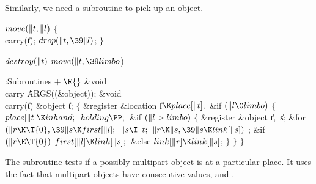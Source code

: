 Similarly, we need a subroutine to pick up an object.

\Y\B\4\D$\\{move}(\|t,\|l)$ \5
${}\{{}$\5
\1\\{carry}(\|t);\5
${}\\{drop}(\|t,\39\|l){}$;\5
${}\}{}$\2\par
\B\4\D$\\{destroy}(\|t)$ \5
$\\{move}(\|t,\39\\{limbo}{}$)\par
\Y\B\4:Subroutines\X${}\mathrel+\E{}$\6
\&{void} \\{carry}\,\,\.{ARGS}((\&{object}));\7
\&{void} \\{carry}(\|t)\1\1\6
\&{object} \|t;\2\2\6
${}\{{}$\5
\1\&{register} \&{location} \|l${}\K\\{place}[\|t];{}$\7
\&{if} ${}(\|l\G\\{limbo}){}$\5
${}\{{}$\1\6
${}\\{place}[\|t]\K\\{inhand};{}$\6
${}\\{holding}\PP;{}$\6
\&{if} ${}(\|l>\\{limbo}){}$\5
${}\{{}$\1\6
\&{register} \&{object} \|r${},{}$ \|s;\7
\&{for} ${}(\|r\K\T{0},\39\|s\K\\{first}[\|l];{}$ ${}\|s\I\|t;{}$ ${}\|r\K\|s,\39\|s\K\\{link}[\|s]){}$\1\5
;\2\6
\&{if} ${}(\|r\E\T{0}){}$\1\5
${}\\{first}[\|l]\K\\{link}[\|s];{}$\2\6
\&{else}\1\5
${}\\{link}[\|r]\K\\{link}[\|s]{}$;\2\6
\4${}\}{}$\2\6
\4${}\}{}$\2\6
\4${}\}{}$\2\par
\fi

The  subroutine tests if a possibly multipart object is
at a particular place. It uses the fact that multipart objects
have consecutive values, and .

